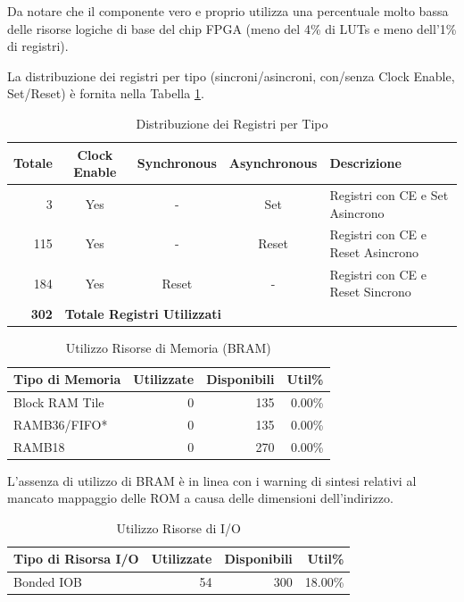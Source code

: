 \documentclass{article}
\begin{document}
Da notare che il componente vero e proprio utilizza una percentuale molto bassa delle risorse logiche di base del chip FPGA (meno del 4\% di LUTs e meno dell'1\% di registri).

La distribuzione dei registri per tipo (sincroni/asincroni, con/senza Clock Enable, Set/Reset) è fornita nella Tabella \ref{tab:registers_by_type}.

\begin{table}[H]
    \centering
    \caption{Distribuzione dei Registri per Tipo}
    \label{tab:registers_by_type}
    \begin{tabular}{|r|c|c|c|l|}
        \hline
        \textbf{Totale} & \textbf{Clock Enable} & \textbf{Synchronous} & \textbf{Asynchronous} & \textbf{Descrizione} \\
        \hline
        3 & Yes & - & Set & Registri con CE e Set Asincrono \\
        115 & Yes & - & Reset & Registri con CE e Reset Asincrono \\
        184 & Yes & Reset & - & Registri con CE e Reset Sincrono \\
        \hline
        \textbf{302} & \multicolumn{4}{|l|}{\textbf{Totale Registri Utilizzati}} \\
        \hline
    \end{tabular}
\end{table}

\begin{table}[H]
    \centering
    \caption{Utilizzo Risorse di Memoria (BRAM)}
    \label{tab:memory_utilization}
    \begin{tabular}{|l|r|r|r|}
        \hline
        \textbf{Tipo di Memoria} & \textbf{Utilizzate} & \textbf{Disponibili} & \textbf{Util\%} \\
        \hline
        Block RAM Tile & 0 & 135 & 0.00\% \\
        \quad RAMB36/FIFO* & 0 & 135 & 0.00\% \\
        \quad RAMB18 & 0 & 270 & 0.00\% \\
        \hline
    \end{tabular}
\end{table}

L'assenza di utilizzo di BRAM è in linea con i warning di sintesi relativi al mancato mappaggio delle ROM a causa delle dimensioni dell'indirizzo.

\begin{table}[H]
    \centering
    \caption{Utilizzo Risorse di I/O}
    \label{tab:io_utilization}
    \begin{tabular}{|l|r|r|r|}
        \hline
        \textbf{Tipo di Risorsa I/O} & \textbf{Utilizzate} & \textbf{Disponibili} & \textbf{Util\%} \\
        \hline
        Bonded IOB & 54 & 300 & 18.00\% \\
        \hline
    \end{tabular}
\end{table}
\end{document}
